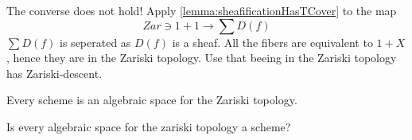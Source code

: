 \begin{warning}
	The converse does not hold! Apply \ref{lemma:sheafificationHasTCover} to the map
	\[Zar \ni 1 + 1 \to \sum D(f) \]
	$\sum D(f)$ is seperated as $D(f)$ is a sheaf.
	All the fibers are equivalent to $1 + X$, hence they are in the Zariski topology.
	Use that beeing in the Zariski topology has Zariski-descent.	
\end{warning}
\begin{corollary}
		Every scheme is an algebraic space for the Zariski topology.
\end{corollary}
\begin{question}
	Is every algebraic space for the zariski topology a scheme?
\end{question}

%
%
